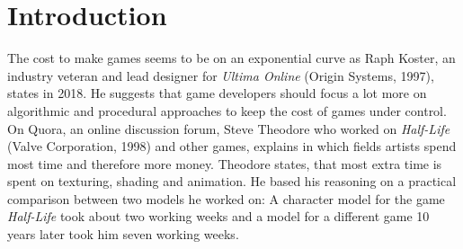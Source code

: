\documentclass[10pt,a4paper]{article}
\begin{document}
\section{Introduction}\label{sec:Introduction}
\begin{multicols}{2}
The cost to make games seems to be on an exponential curve as Raph Koster, an industry veteran and lead designer for \textit{Ultima Online} (Origin Systems, 1997), states in 2018. He suggests that game developers should focus a lot more on algorithmic and procedural approaches to keep the cost of games under control\cite{Koster2018}. On Quora, an online discussion forum, Steve Theodore who worked on \textit{Half-Life} (Valve Corporation, 1998) and other games, explains in which fields artists spend most time and therefore more money. Theodore states, that most extra time is spent on texturing, shading and animation. He based his reasoning on a practical comparison between two models he worked on: A character model for the game \textit{Half-Life} took about two working weeks and a model for a different game 10 years later took him seven working weeks\cite{Prinke2017}.


\end{multicols}
\end{document}
